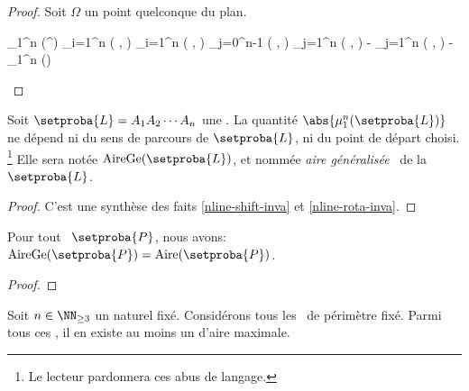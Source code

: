 \begin{proof}
	Soit $\Omega$ un point quelconque du plan.

	\begin{stepcalc}[style=ar*]
		\mu_1^n (^{})
	\explnext{}
		\dsum_{i=1}^{n} \det \big(  ,  \big)
	\explnext{}
		\dsum_{i=1}^{n} \det \big(  ,  \big)
	\explnext{}
		\dsum_{j=0}^{n-1} \det \big(  ,  \big)
		\dsum_{j=1}^{n} \det \big(  ,  \big)
	\explnext{}
		{} - \dsum_{j=1}^{n} \det \big(  ,   \big)
	\explnext{}
		{} - \mu_1^n ()
	\end{stepcalc}
	
	\null\vspace{-3.5ex}
\end{proof}
	
	


\begin{fact}
	Soit 
	$\setproba{L} = A_1 A_2 \cdots A_n$ une \nline.
	La quantité $\abs{\mu_1^n (\setproba{L})}$ ne dépend ni du sens de parcours de $\setproba{L}$, ni du point de départ choisi.%
	\footnote{
		Le lecteur pardonnera ces abus de langage.
	}
	Elle sera notée $\garea{\setproba{L}}$, et nommée \og \emph{aire généralisée} \fg\ de la \nline\ $\setproba{L}$.
\end{fact}


\begin{proof}
	C'est une synthèse des faits \ref{nline-shift-inva} et \ref{nline-rota-inva}.
\end{proof}
	
	


\begin{fact}
	Pour tout \ngone\ $\setproba{P}$, nous avons: $\garea{\setproba{P}} = \area{\setproba{P}}$.
\end{fact}


\begin{proof}
\end{proof}




\begin{fact} \label{suff-cond}
	Soit $n \in \NN_{\geq3}$ un naturel fixé.
	Considérons tous les \ngones\ de périmètre fixé. Parmi tous ces \ngones, il en existe au moins un d'aire maximale.
\end{fact}


